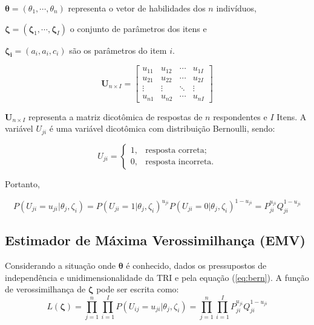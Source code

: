 \noindent $ \boldsymbol{\theta} = (\theta_1, \cdots, \theta_n) $  representa o vetor de habilidades dos $n$ indivíduos,

\noindent $ \boldsymbol{\zeta} = (\boldsymbol{\zeta}_1, \cdots, \boldsymbol{\zeta}_I) $ o conjunto de parâmetros dos itens e

\noindent $ \boldsymbol{\zeta_i} = (a_i, a_i, c_i) $ são os parâmetros do item $i$.

\[ \textbf{U}_{n\times I} =  
\begin{bmatrix}
	u_{11} & u_{12} & \cdots & u_{1I} \\
	u_{21} & u_{22} & \cdots & u_{2I} \\
	\vdots & \vdots & \ddots & \vdots\\
	u_{n1} & u_{n2} & \cdots & u_{nI}
\end{bmatrix}
\]

\noindent $\textbf{U}_{n\times I}$ representa a matriz dicotômica de respostas de $ n $ respondentes e $ I $ Itens. A variável $U_{ji}$ é uma variável dicotômica com distribuição Bernoulli, sendo:

\[U_{ji} =    \begin{cases}
	
	  1, & \mbox{resposta correta;}  \\
	
	  0, & \mbox{resposta incorreta.}
	
\end{cases}
\]

Portanto,  

\begin{equation} \label{eq:bern}
P(U_{ji} = u_{ji}|\theta_j, \zeta_i) = P(U_{ji} = 1|\theta_j, \zeta_i)^{u_{ji}}
P(U_{ji} = 0|\theta_j, \zeta_i)^{1 - u_{ji}} = P_{ji}^{u_{ji}}Q_{ji}^{1-u_{ji}}
\end{equation}


\subsection{Estimador de Máxima Verossimilhança (EMV)}

Considerando a situação onde $ \boldsymbol{\theta} $ é conhecido, dados os pressupostos de independência e unidimensionalidade da TRI e pela equação (\ref{eq:bern}). A função de verossimilhança de  $ \boldsymbol{\zeta} $ pode ser escrita como:
\[
L(\boldsymbol{\zeta}) =  \prod_{j=1}^{n}\prod_{i=1}^{I}P(U_{ij} = u_{ji}|\theta_j, \zeta_i) = \prod_{j=1}^{n}\prod_{i=1}^{I}P_{ji}^{u_{ji}}Q_{ji}^{1-u_{ji}}
\]

